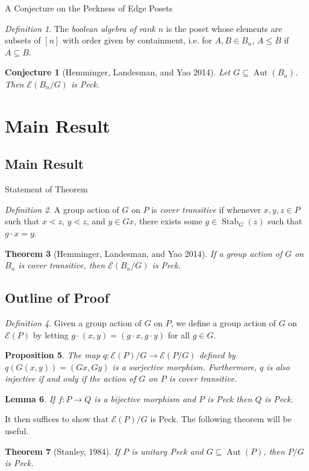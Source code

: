 \documentclass[pdf]{beamer}
\newtheorem{thm}{Theorem}
\newtheorem{lem}[thm]{Lemma}
\newtheorem{prop}[thm]{Proposition}
\newtheorem{conjecture}{Conjecture}
\theoremstyle{remark}
\newtheorem{defn}[thm]{Definition}
\newcommand\Aut{\operatorname{Aut}}
\def\Stab{\operatorname{Stab}}
\begin{document}
\begin{frame}{A Conjecture on the Peckness of Edge Posets}
\begin{defn}
The \textit{boolean algebra of rank $n$} is the poset whose elements are subsets of $[n]$ with order given by containment, i.e. for $A,B\in B_n$, $A\le B$ if $A\subseteq B$.
\end{defn}


\begin{conjecture}[Hemminger, Landesman, and Yao 2014]
Let $G\subseteq \Aut(B_n)$.  Then $\mathcal{E}(B_n/G)$ is Peck.
\end{conjecture}
\end{frame}

\section{Main Result}
\subsection{Main Result}
\begin{frame}{Statement of Theorem}
\begin{defn}
A group action of $G$ on $P$ is \textit{cover transitive} if whenever $x,y,z\in P$ such that $x\lessdot z$, $y\lessdot z$, and $y\in Gx$, there exists some $g\in \Stab_G(z)$ such that $g\cdot x = y$.
\end{defn}

\begin{thm}[Hemminger, Landesman, and Yao 2014]
If a group action of $G$ on $B_n$ is cover transitive, then $\mathcal{E}(B_n/G)$ is Peck.
\end{thm}
\end{frame}

\subsection{Outline of Proof}

\begin{frame}
\begin{defn}
Given a group action of $G$ on $P$, we define a group action of $G$ on $\mathcal{E}(P)$ by letting $g\cdot (x,y) = (g\cdot x,g\cdot y)$ for all $g\in G$.
\end{defn}
\pause
\begin{prop}
The map $q\colon \mathcal{E}(P)/G\rightarrow \mathcal{E}(P/G)$ defined by $q(G(x,y)) = (Gx,Gy)$ is a surjective morphism.  Furthermore, $q$ is also injective if and only if the action of $G$ on $P$ is cover transitive.
\end{prop}

\begin{lem}
If $f:P\rightarrow Q$ is a bijective morphism and $P$ is Peck then $Q$ is Peck.
\end{lem}
\end{frame}

\begin{frame}
It then suffices to show that $\mathcal{E}(P)/G$ is Peck.  The following theorem will be useful.

\begin{thm}[Stanley, 1984]
If $P$ is unitary Peck and $G\subseteq\operatorname{Aut}(P)$, then $P/G$ is Peck.
\end{thm}
\end{frame}
\end{document}
